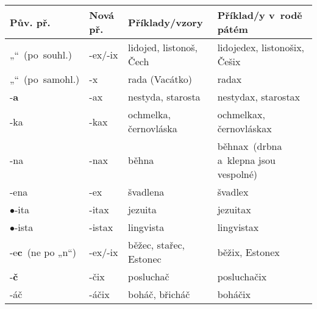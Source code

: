 \begin{table}
\newcommand*{\cizipripona}[1]{\mbox{}\ensuremath{\bullet}\hspace{0.5em}\mbox{}#1}
\newcommand*{\jinezakonceni}[1]{\mbox{}\ensuremath{\diamond}\hspace{0.5em}\mbox{}#1}
{
\begin{longtabu}{|X[1,R]|X[1,R]|X[3,L]|X[3,L]|}
\hline%
{\bfseries\small Pův. př.}&{\bfseries\small Nová př.}&\textbf{Příklady/vzory}&\textbf{Příklad/y v rodě pátém}\\\hline\endhead%
\raggedright\footnotesize{}„“\hspace{-0.25em}~(po~souhl.)%
                &-ex/-ix&lidojed, listonoš, Čech&lidojedex, listonošix, Češix\\\hline%
\raggedright\footnotesize{}„“\hspace{-0.25em}~(po~samohl.)%
                &-x&rada (Vacátko)&radax\\\hline%
-\textbf{a}     &-ax    &nestyda, starosta  &nestydax, starostax\\\hline%
-ka             &-kax   &ochmelka, černovláska &ochmelkax, černovláskax\\\hline%
-na             &-nax   &běhna&běhnax\small\ (drbna a klepna jsou vespolné)\\\hline%
-ena            &-ex    &švadlena           &švadlex\\\hline%
\cizipripona{-ita}&-itax  &jezuita &jezuitax\\\hline%
\cizipripona{-ista}&-istax &lingvista          &lingvistax\\\hline%

-e\textbf{c}\footnotesize{}~(ne po „n“) &-ex/-ix&běžec, stařec, Estonec    &běžix, Estonex\\\hline%
-\textbf{č}              &-čix   &posluchač           &posluchačix\\\hline%
-áč             &-áčix  &boháč, břicháč &boháčix\\\hline%


\end{longtabu}}
\end{table}
